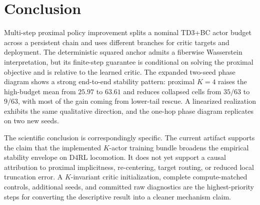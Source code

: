 \section{Conclusion}
\label{sec:conclusion}

Multi-step proximal policy improvement splits a nominal TD3+BC actor budget across a persistent chain and uses different branches for critic targets and deployment. The deterministic squared anchor admits a fiberwise Wasserstein interpretation, but its finite-step guarantee is conditional on solving the proximal objective and is relative to the learned critic. The expanded two-seed phase diagram shows a strong end-to-end stability pattern: proximal $K=4$ raises the high-budget mean from $25.97$ to $63.61$ and reduces collapsed cells from $35/63$ to $9/63$, with most of the gain coming from lower-tail rescue. A linearized realization exhibits the same qualitative direction, and the one-hop phase diagram replicates on two new seeds.

The scientific conclusion is correspondingly specific. The current artifact supports the claim that the implemented $K$-actor training bundle broadens the empirical stability envelope on D4RL locomotion. It does not yet support a causal attribution to proximal implicitness, re-centering, target routing, or reduced local truncation error. A $K$-invariant critic initialization, complete compute-matched controls, additional seeds, and committed raw diagnostics are the highest-priority steps for converting the descriptive result into a cleaner mechanism claim.
